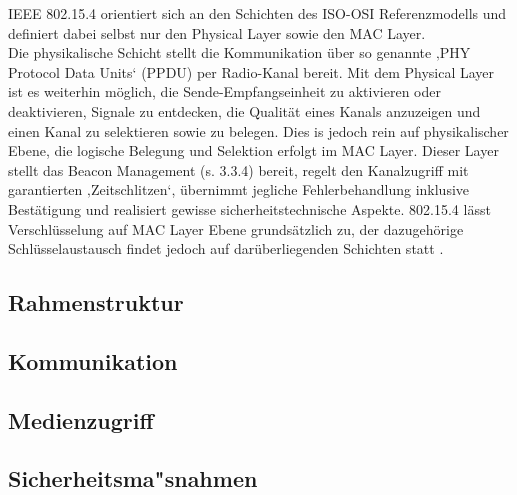 IEEE 802.15.4 orientiert sich an den Schichten des ISO-OSI Referenzmodells und definiert dabei selbst nur den Physical Layer sowie den MAC Layer. \\
Die physikalische Schicht stellt die Kommunikation über so genannte ‚PHY Protocol Data Units‘ (PPDU) per Radio-Kanal bereit. Mit dem Physical Layer ist es weiterhin möglich, die Sende-Empfangseinheit zu aktivieren oder deaktivieren, Signale zu entdecken, die Qualität eines Kanals anzuzeigen und einen Kanal zu selektieren sowie zu belegen. Dies is jedoch rein auf physikalischer Ebene, die logische Belegung und Selektion erfolgt im MAC Layer.
Dieser Layer stellt das Beacon Management (s. 3.3.4) bereit, regelt den Kanalzugriff mit garantierten ‚Zeitschlitzen‘, übernimmt jegliche Fehlerbehandlung inklusive Bestätigung und realisiert gewisse sicherheitstechnische Aspekte. 802.15.4 lässt Verschlüsselung auf MAC Layer Ebene grundsätzlich zu, der dazugehörige Schlüsselaustausch findet jedoch auf darüberliegenden Schichten statt \cite{d:hesse} \cite{d:ieee}.

\subsection{Rahmenstruktur}\label{ss:Rahmenstruktur}

\subsection{Kommunikation}\label{ss:Kommunikation}

\subsection{Medienzugriff}\label{ss:Medienzugriff}

\subsection{Sicherheitsma"snahmen}\label{ss:Sicherheitsmassnahmen}